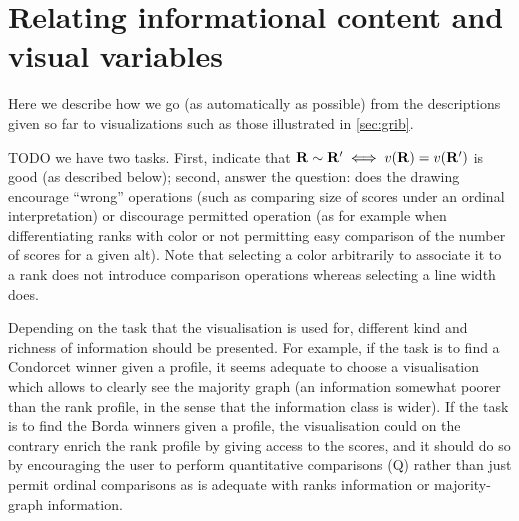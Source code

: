 \documentclass[version=last, pagesize, twoside=off, bibliography=totoc, DIV=calc, fontsize=12pt, a4paper, french, english]{scrartcl}
\begin{document}
\section{Relating informational content and visual variables}
Here we describe how we go (as automatically as possible) from the descriptions given so far to visualizations such as those illustrated in \cref{sec:grib}.

TODO we have two tasks. First, indicate that $\mathbf{R} \sim \mathbf{R}' \iff v(\mathbf{R}) = v(\mathbf{R}')$ is good (as described below); second, answer the question: does the drawing encourage “wrong” operations (such as comparing size of scores under an ordinal interpretation) or discourage permitted operation (as for example when differentiating ranks with color or not permitting easy comparison of the number of scores for a given alt). Note that selecting a color arbitrarily to associate it to a rank does not introduce comparison operations whereas selecting a line width does.

Depending on the task that the visualisation is used for, different kind and richness of information should be presented. For example, if the task is to find a Condorcet winner given a profile, it seems adequate to choose a visualisation which allows to clearly see the majority graph (an information somewhat poorer than the rank profile, in the sense that the information class is wider). If the task is to find the Borda winners given a profile, the visualisation could on the contrary enrich the rank profile by giving access to the scores, and it should do so by encouraging the user to perform quantitative comparisons (Q) rather than just permit ordinal comparisons as is adequate with ranks information or majority-graph information. 
\end{document}
